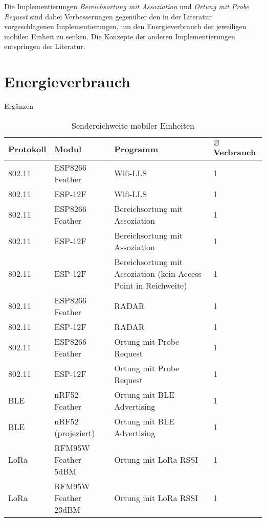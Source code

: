 Die Implementierungen \emph{Bereichsortung mit Assoziation} und \emph{Ortung mit Probe Request} sind dabei Verbesserungen gegenüber den in der Literatur vorgeschlagenen Implementierungen, um den Energieverbrauch der jeweiligen mobilen Einheit zu senken.
Die Konzepte der anderen Implementierungen entspringen der Literatur.

\section{Energieverbrauch}
Ergänzen


\begin{table}[h]
	\centering
	\caption{Sendereichweite mobiler Einheiten}
	\label{table:ranges}
	\begin{tabular}{p{1.8cm}|p{3.5cm}|p{6cm}|p{2.3cm}}
		Protokoll & Modul & Programm  & $\varnothing$ Verbrauch\\
		\hline
		802.11 & ESP8266 Feather & Wifi-LLS & 1 \\
		802.11 & ESP-12F & Wifi-LLS & 1\\
		802.11 & ESP8266 Feather & Bereichsortung mit Assoziation & 1 \\
		802.11 & ESP-12F & Bereichsortung mit Assoziation & 1\\
		\hline
		802.11 & ESP-12F & Bereichsortung mit Assoziation (kein Access Point in Reichweite) & 1\\
		\hline
		802.11 & ESP8266 Feather & RADAR & 1\\
		802.11 & ESP-12F & RADAR & 1\\
		802.11 & ESP8266 Feather & Ortung mit Probe Request & 1\\
		802.11 & ESP-12F & Ortung mit Probe Request & 1\\
		\hline
		BLE & nRF52 Feather & Ortung mit BLE Advertising & 1\\
		BLE & nRF52 (projeziert) & Ortung mit BLE Advertising & 1\\
		\hline
		LoRa & RFM95W Feather 5dBM & Ortung mit LoRa RSSI & 1\\
		LoRa & RFM95W Feather 23dBM & Ortung mit LoRa RSSI & 1\\
	\end{tabular}
\end{table}

